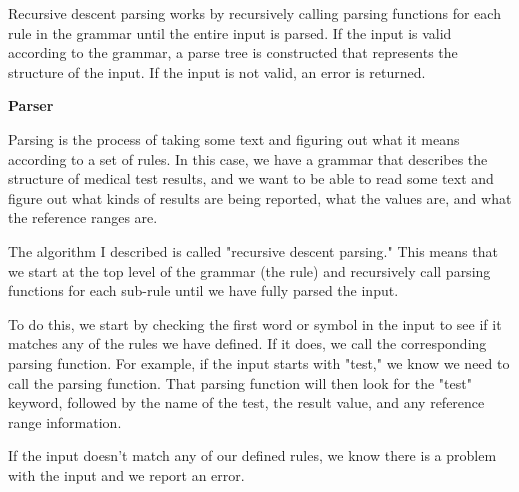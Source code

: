 Recursive descent parsing works by recursively calling parsing functions for each rule in the grammar until the entire input is parsed. If the input is valid according to the grammar, a parse tree is constructed that represents the structure of the input. If the input is not valid, an error is returned.

\textbf{Parser}

Parsing is the process of taking some text and figuring out what it means according to a set of rules. In this case, we have a grammar that describes the structure of medical test results, and we want to be able to read some text and figure out what kinds of results are being reported, what the values are, and what the reference ranges are.

The algorithm I described is called "recursive descent parsing." This means that we start at the top level of the grammar (the rule) and recursively call parsing functions for each sub-rule until we have fully parsed the input.

To do this, we start by checking the first word or symbol in the input to see if it matches any of the rules we have defined. If it does, we call the corresponding parsing function. For example, if the input starts with "test," we know we need to call the parsing function. That parsing function will then look for the "test" keyword, followed by the name of the test, the result value, and any reference range information.

If the input doesn't match any of our defined rules, we know there is a problem with the input and we report an error.

